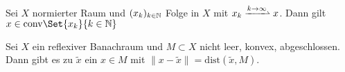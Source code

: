 \documentclass{cheat-sheet}
\newcommand{\K}{\mathbb{K}}
\newcommand{\convWeaklyWith}[1]{\xrightharpoonup{#1 \to \infty}} %
\begin{document}
\begin{lem}[Mazur]
  Sei $X$ normierter Raum und $(x_k)_{k \in \mathbb{N}}$ Folge in $X$ mit $x_k \convWeaklyWith{k} x$. Dann gilt $x \in \mathrm{conv} \Set{ x_k }{ k \in \N }$
\end{lem}

\begin{satz}
  Sei $X$ ein reflexiver Banachraum und $M \subset X$ nicht leer, konvex, abgeschlossen. Dann gibt es zu $\tilde{x}$ ein $x \in M$ mit $\| x - \tilde{x} \| = \mathrm{dist}(\tilde{x}, M)$.
\end{satz}



\end{document}
